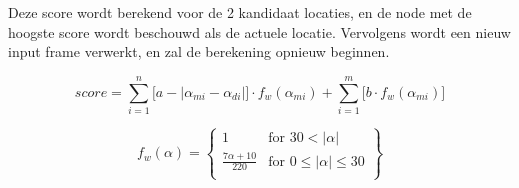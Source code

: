 Deze score wordt berekend voor de 2 kandidaat locaties, en de node met de hoogste score wordt beschouwd als de actuele locatie.
Vervolgens wordt een nieuw input frame verwerkt, en zal de berekening opnieuw beginnen.

\begin{equation}\label{eq:score}
    score = \sum_{i=1}^{n}\big[a - |\alpha_{mi} - \alpha_{di}|\big] \cdot f_w(\alpha_{mi}) + \sum_{i=1}^{m}\big[b \cdot f_w(\alpha_{mi})\big]
\end{equation}

\begin{equation}\label{eq:score_weights}
    f_w(\alpha) = \left\{\begin{array}{lr}
                1 & \text{for } 30 < |\alpha|\\
                \frac{7\alpha + 10}{220} & \text{for } 0 \leq |\alpha| \leq 30\\
    \end{array}
    \right\}
\end{equation}
